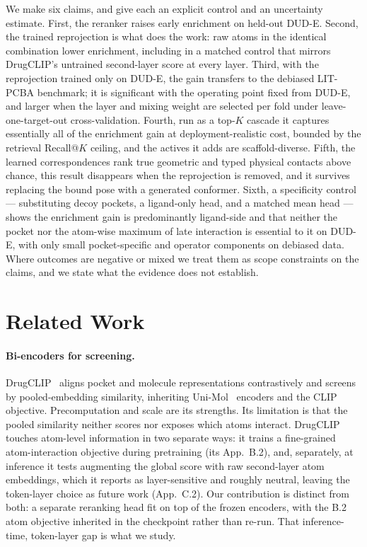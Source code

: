 \documentclass[10pt,letterpaper,twocolumn]{article}
\begin{document}
We make six claims, and give each an explicit control and an uncertainty estimate. First, the reranker raises early enrichment on held-out DUD-E. Second, the trained reprojection is what does the work: raw atoms in the identical combination lower enrichment, including in a matched control that mirrors DrugCLIP's untrained second-layer score at every layer. Third, with the reprojection trained only on DUD-E, the gain transfers to the debiased LIT-PCBA benchmark; it is significant with the operating point fixed from DUD-E, and larger when the layer and mixing weight are selected per fold under leave-one-target-out cross-validation. Fourth, run as a top-$K$ cascade it captures essentially all of the enrichment gain at deployment-realistic cost, bounded by the retrieval Recall@$K$ ceiling, and the actives it adds are scaffold-diverse. Fifth, the learned correspondences rank true geometric and typed physical contacts above chance, this result disappears when the reprojection is removed, and it survives replacing the bound pose with a generated conformer. Sixth, a specificity control --- substituting decoy pockets, a ligand-only head, and a matched mean head --- shows the enrichment gain is predominantly ligand-side and that neither the pocket nor the atom-wise maximum of late interaction is essential to it on DUD-E, with only small pocket-specific and operator components on debiased data. Where outcomes are negative or mixed we treat them as scope constraints on the claims, and we state what the evidence does not establish.

\section{Related Work}

\paragraph{Bi-encoders for screening.} DrugCLIP~\cite{drugclip} aligns pocket and molecule representations contrastively and screens by pooled-embedding similarity, inheriting Uni-Mol~\cite{unimol} encoders and the CLIP~\cite{clip} objective. Precomputation and scale are its strengths. Its limitation is that the pooled similarity neither scores nor exposes which atoms interact. DrugCLIP touches atom-level information in two separate ways: it trains a fine-grained atom-interaction objective during pretraining (its App.~B.2), and, separately, at inference it tests augmenting the global score with raw second-layer atom embeddings, which it reports as layer-sensitive and roughly neutral, leaving the token-layer choice as future work (App.~C.2). Our contribution is distinct from both: a separate reranking head fit on top of the frozen encoders, with the B.2 atom objective inherited in the checkpoint rather than re-run. That inference-time, token-layer gap is what we study.
\end{document}
